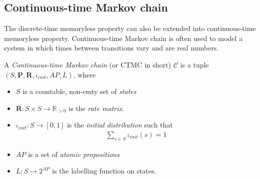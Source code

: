 \subsection{Continuous-time Markov chain}
The discrete-time memoryless property can also be extended into continuous-time memoryless property.
Continuous-time Markov chain is often used to model a system in which times between transitions
vary and are real numbers.
\begin{definition}
      A \textit{Continuous-time Markov chain} (or CTMC in short) $\mathcal{C}$ is a tuple
      $(S,\mathbf{P}, \mathbf{R}, \iota_{init}, AP, L)$, where
      \begin{itemize}
            \item $S$ is a countable, non-emty set of \textit{states}
            \item $\mathbf{R}:S\times S \rightarrow \mathbb{R}_{>0}$ is the \textit{rate matrix}.
            \item $\iota_{init}: S \rightarrow [0,1]$ is the \textit{initial distribution} such that
                  \begin{align*}
                        \sum_{s\in S}\iota_{init}(s) = 1
                  \end{align*}
            \item $AP$ is a set of \textit{atomic propositions}
            \item $L: S \rightarrow 2^{AP}$ is the labelling function on states.
      \end{itemize}
\end{definition}

